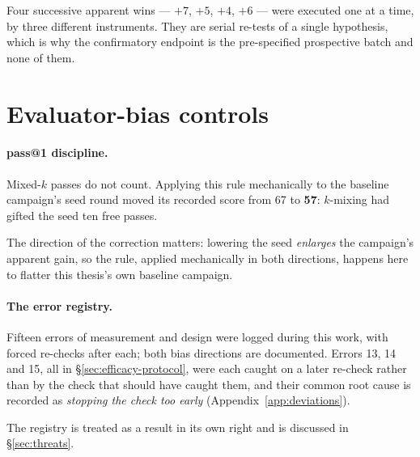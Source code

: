 Four successive apparent wins --- $+7$, $+5$, $+4$, $+6$ --- were executed
one at a time, by three different instruments. They are serial re-tests of
a single hypothesis, which is why the confirmatory endpoint is the
pre-specified prospective batch and none of them.

\section{Evaluator-bias controls}
\label{sec:evaluator-bias}

\paragraph{pass@1 discipline.} Mixed-$k$ passes do not count. Applying this
rule mechanically to the baseline campaign's seed round moved its recorded
score from 67 to \textbf{57}: $k$-mixing had gifted the seed ten free
passes.

The direction of the correction matters: lowering the seed \emph{enlarges}
the campaign's apparent gain, so the rule, applied mechanically in both
directions, happens here to flatter this thesis's own baseline campaign.

\paragraph{The error registry.} Fifteen errors of measurement and design
were logged during this work, with forced re-checks after each; both bias
directions are documented. Errors 13, 14 and 15, all in
\S\ref{sec:efficacy-protocol}, were each caught on a later re-check rather
than by the check that should have caught them, and their common root
cause is recorded as \emph{stopping the check too early}
(Appendix~\ref{app:deviations}).

The registry is treated as a result in its own right and is discussed in
\S\ref{sec:threats}.
